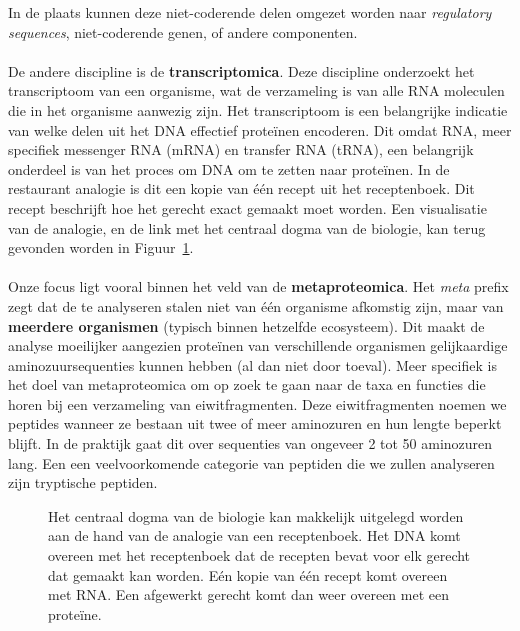 In de plaats kunnen deze niet-coderende delen omgezet worden naar \textit{regulatory sequences}, niet-coderende genen, of andere componenten.
\\ \\
De andere discipline is de \textbf{transcriptomica}.
Deze discipline onderzoekt het transcriptoom van een organisme, wat de verzameling is van alle RNA moleculen die in het organisme aanwezig zijn.
Het transcriptoom is een belangrijke indicatie van welke delen uit het DNA effectief proteïnen encoderen.
Dit omdat RNA, meer specifiek messenger RNA (mRNA) en transfer RNA (tRNA), een belangrijk onderdeel is van het proces om DNA om te zetten naar proteïnen.
In de restaurant analogie is dit een kopie van één recept uit het receptenboek.
Dit recept beschrijft hoe het gerecht exact gemaakt moet worden.
Een visualisatie van de analogie, en de link met het centraal dogma van de biologie, kan terug gevonden worden in Figuur~\ref{fig:recipe}.
\\ \\
Onze focus ligt vooral binnen het veld van de \textbf{metaproteomica}.
Het \textit{meta} prefix zegt dat de te analyseren stalen niet van één organisme afkomstig zijn, maar van \textbf{meerdere organismen} (typisch binnen hetzelfde ecosysteem).
Dit maakt de analyse moeilijker aangezien proteïnen van verschillende organismen gelijkaardige aminozuursequenties kunnen hebben (al dan niet door toeval).
Meer specifiek is het doel van metaproteomica om op zoek te gaan naar de taxa en functies die horen bij een verzameling van eiwitfragmenten.
Deze eiwitfragmenten noemen we peptides wanneer ze bestaan uit twee of meer aminozuren en hun lengte beperkt blijft.
In de praktijk gaat dit over sequenties van ongeveer 2 tot 50 aminozuren lang.
Een een veelvoorkomende categorie van peptiden die we zullen analyseren zijn tryptische peptiden.

\begin{figure}[H]
    \centering
    
    \caption{Het centraal dogma van de biologie kan makkelijk uitgelegd worden aan de hand van de analogie van een receptenboek. Het DNA komt overeen met het receptenboek dat de recepten bevat voor elk gerecht dat gemaakt kan worden. Eén kopie van één recept komt overeen met RNA. Een afgewerkt gerecht komt dan weer overeen met een proteïne.}
    \label{fig:recipe}
\end{figure}


